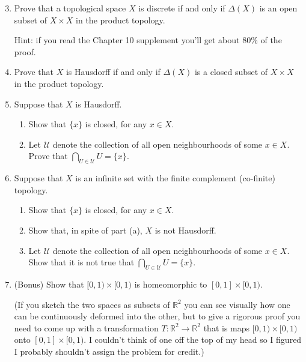 \documentclass[letterpaper,12pt]{article}
\newcommand{\R}{\mathbb{R}}
\begin{document}
\begin{enumerate}
\setcounter{enumi}{2}
\item Prove that a topological space $X$ is discrete if and only if $\Delta(X)$ is an open subset of $X\times X$ in the product topology.

Hint: if you read the Chapter 10 supplement you'll get about 80\% of the proof.
\item Prove that $X$ is Hausdorff if and only if $\Delta(X)$ is a closed subset of $X\times X$ in the product topology.
\item Suppose that $X$ is Hausdorff.
\begin{enumerate}
 \item Show that $\{x\}$ is closed, for any $x\in X$.
 \item Let $\mathcal{U}$ denote the collection of all open neighbourhoods of some $x\in X$. Prove that $\bigcap_{U\in \mathcal{U}}U = \{x\}$.
\end{enumerate}
 \item Suppose that $X$ is an infinite set with the finite complement (co-finite) topology.
\begin{enumerate}
 \item Show that $\{x\}$ is closed, for any $x\in X$.
 \item Show that, in spite of part (a), $X$ is not Hausdorff.
 \item Let $\mathcal{U}$ denote the collection of all open neighbourhoods of some $x\in X$. Show that it is not true that $\bigcap_{U\in \mathcal{U}}U = \{x\}$.
\end{enumerate}
 \item (Bonus) Show that $[0,1)\times [0,1)$ is homeomorphic to $[0,1]\times [0,1)$.

(If you sketch the two spaces as subsets of $\R^2$ you can see visually how one can be continuously deformed into the other, but to give a rigorous proof you need to come up with a transformation $T:\R^2\to \R^2$ that is maps $[0,1)\times [0,1)$ onto $[0,1]\times [0,1)$. I couldn't think of one off the top of my head so I figured I probably shouldn't assign the problem for credit.)


\end{enumerate}
\end{document}
